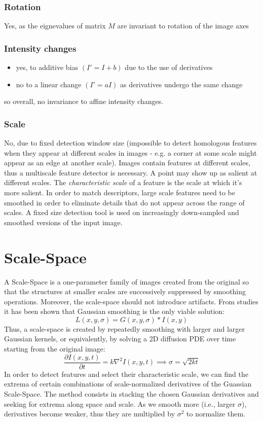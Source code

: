 \documentclass{article}
\begin{document}
\subsubsection{Rotation}
Yes, as the eignevalues of matrix $M$ are invariant to rotation of the image axes
\subsubsection{Intensity changes}
\begin{itemize}
  \item yes, to additive bias $(I'=I+b)$ due to the use of derivatives
    \item no to a linear change $(I' = aI)$ as derivatives undergo the same change
\end{itemize}
so overall, no invariance to affine intensity changes. 
\subsubsection{Scale}
No, due to fixed detection window size (impossible to detect homologous features when they appear at different scales in images - e.g. a corner at some scale might appear as an edge at another scale). Images contain features at different scales, thus a multiscale feature detector is necessary. A point may show up as salient at different scales. The \emph{characteristic scale} of a feature is the scale at which it's more salient. In order to match descriptors, large scale features need to be smoothed in order to eliminate details that do not appear across the range of scales. A fixed size detection tool is used on increasingly down-sampled and smoothed versions of the input image. 

\section{Scale-Space}
A Scale-Space is a one-parameter family of images created from the original so that the structures at smaller scales are successively suppressed by smoothing operations. Moreover, the scale-space should not introduce artifacts. From studies it has been shown that Gaussian smoothing is the only viable solution: 
\[
  L(x,y,\sigma) = G(x,y,\sigma)\ast I (x,y)
\]
Thus, a scale-space is created by repeatedly smoothing with larger and larger Gaussian kernels, or equivalently, by solving a 2D diffusion PDE over time starting from the original image: 
\[
  \frac{\partial I(x,y,t) }{\partial t} = k\nabla^2I(x,y,t) \implies \sigma=\sqrt{2kt}
\]
In order to detect features and select their characteristic scale, we can find the extrema of certain combinations of scale-normalized derivatives of the Guassian Scale-Space. The method consists in stacking the chosen Gaussian derivatives and seeking for extrema along space and scale. As we smooth more (i.e., larger $\sigma$), derivatives become weaker, thus they are multiplied by $\sigma^2$ to normalize them.
\end{document}
